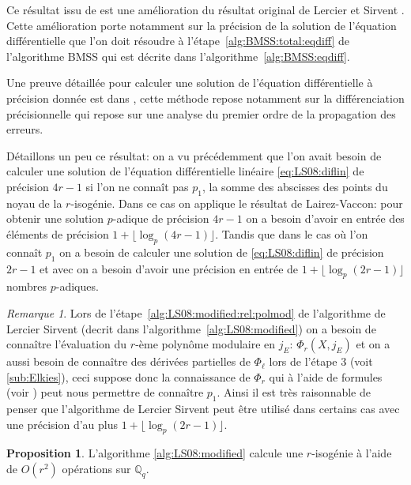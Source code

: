 \documentclass[10pt,a4paper]{book}
\theoremstyle{plain}
\theoremstyle{definition}
\theoremstyle{definition}
\theoremstyle{definition}
\newtheorem{prop}[thm]{Proposition}
\theoremstyle{definition}
\theoremstyle{remark}
\newtheorem{rem}[thm]{Remarque}
\theoremstyle{remark}
\theoremstyle{definition}
\begin{document}
Ce résultat issu de \cite[Theorem 2]{LairezVaccon16} est une amélioration du résultat original de Lercier et Sirvent \cite{Lercier-Sirvent2008}. Cette amélioration porte notamment sur la précision de la solution de l'équation différentielle que l'on doit résoudre à l'étape~\ref{alg:BMSS:total:eqdiff} de l'algorithme BMSS  qui est décrite dans l'algorithme~\ref{alg:BMSS:eqdiff}.


Une preuve détaillée pour calculer une solution de l'équation différentielle à précision donnée est dans \cite{LairezVaccon16}, cette méthode repose notamment sur la différenciation précisionnelle qui repose sur une analyse du premier ordre de la propagation des erreurs. 

Détaillons un peu ce résultat: on a vu précédemment que l'on avait besoin de 
calculer une solution de l'équation différentielle linéaire 
\eqref{eq:LS08:diflin} de précision $4r-1$ si l'on ne connaît pas $p_1$, la 
somme des abscisses des points du noyau de la $r$-isogénie. Dans ce cas on 
applique le résultat de Lairez-Vaccon: pour obtenir une solution $p$-adique de 
précision $4 r-1$ on a besoin d'avoir en entrée des éléments de précision $ 1 +
\lfloor \log_p(4 r - 1) \rfloor $. Tandis que dans le cas où l'on connaît $p_1$
on a besoin de calculer une solution de \eqref{eq:LS08:diflin} de précision 
$2r - 1$ et avec \cite[Theorem 2]{LairezVaccon16} on a besoin d'avoir une 
précision en entrée de $ 1 + \lfloor \log_p(2 r - 1) \rfloor $ nombres 
$p$-adiques.

\begin{rem}
Lors de l'étape~\ref{alg:LS08:modified:rel:polmod} de l'algorithme de Lercier Sirvent (decrit dans l'algorithme~\ref{alg:LS08:modified}) on a besoin de connaître l'évaluation du $r$-ème polynôme modulaire en $j_E$: $\Phi_{r}(X,j_E)$ et on a aussi besoin de connaître des dérivées partielles de $\Phi_{\ell}$ lors de l'étape $3$ (voit \ref{sub:Elkies}), ceci suppose donc la connaissance de $\Phi_{r}$ qui à l'aide de formules (voir \cite[Theorem 17.22]{ehcc05}) peut nous permettre de connaître $p_1$. Ainsi il est très raisonnable de penser que l'algorithme de Lercier Sirvent peut être utilisé dans certains cas avec une précision d'au plus $1 + \lfloor \log_{p}(2r - 1) \rfloor$.
\end{rem}

\begin{prop}
L'algorithme \ref{alg:LS08:modified} calcule une $r$-isogénie à l'aide de $O(r^2)$  opérations sur $\mathbb{Q}_q$.
\end{prop}
\end{document}
